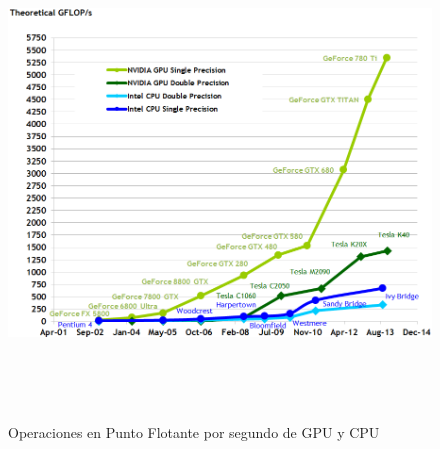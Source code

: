 \begin{figure}[H]
			\centering
				\includegraphics[height=13cm]{img/flops.png}
			\caption{Operaciones en Punto Flotante por segundo de GPU y CPU \cite{Flops}}
\end{figure}
